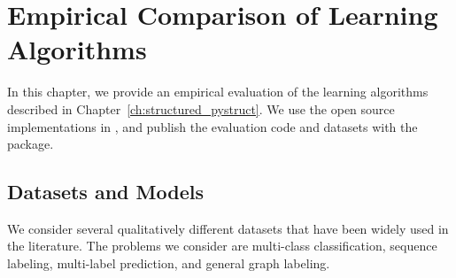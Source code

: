 \chapter{Empirical Comparison of Learning Algorithms}\label{ch:comparison}
In this chapter, we provide an empirical evaluation of the learning algorithms
described in Chapter~\ref{ch:structured_pystruct}.  We use the open source
implementations in \pystruct, and publish the evaluation code and datasets with
the package.

\section{Datasets and Models}
We consider several qualitatively different datasets that have been widely used in the literature.
The problems we consider are multi-class classification, sequence labeling, multi-label prediction,
and general graph labeling.

